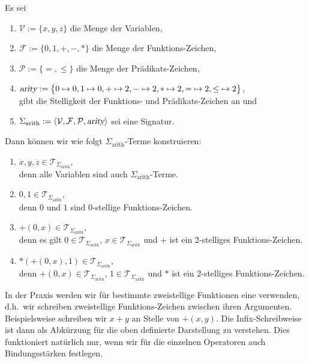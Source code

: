 \example
Es sei 
\begin{enumerate}
\item $\mathcal{V} := \{ x, y, z \}$ die Menge der Variablen,
\item $\mathcal{F} := \{ 0, 1, \mathtt{+}, \mathtt{-}, * \}$ die Menge der Funktions-Zeichen,
\item $\mathcal{P} := \{\mathtt{=}, \leq\}$ die Menge der Prädikats-Zeichen,
\item $\textsl{arity} := \bigl\{ 0 \mapsto 0, 1 \mapsto 0, \mathtt{+} \mapsto 2, \mathtt{-} \mapsto 2,
                                 * \mapsto 2, = \;\mapsto 2, \leq\; \mapsto 2 \bigr\}$, \\[0.2cm]
      gibt die Stelligkeit der Funktions- und Prädikats-Zeichen an und
\item $\Sigma_\mathrm{arith} := \langle \mathcal{V}, \mathcal{F}, \mathcal{P}, \textsl{arity} \rangle$
      sei eine Signatur.
\end{enumerate}
Dann können wir wie folgt $\Sigma_{\mathrm{arith}}$-Terme konstruieren:
\begin{enumerate}
\item $x, y, z \in \mathcal{T}_{\Sigma_{\mathrm{arith}}}$, \\[0.2cm]
      denn alle Variablen sind auch $\Sigma_{\mathrm{arith}}$-Terme.
\item $0, 1 \in \mathcal{T}_{\Sigma_{\mathrm{arith}}}$,  \\[0.2cm]
      denn $0$ und $1$ sind $0$-stellige Funktions-Zeichen.
\item $\mathtt{+}(0,x) \in \mathcal{T}_{\Sigma_{\mathrm{arith}}}$, \\[0.2cm]
      denn es gilt $0 \in \mathcal{T}_{\Sigma_{\mathrm{arith}}}$, $x \in \mathcal{T}_{\Sigma_{\mathrm{arith}}}$ und 
      $\mathtt{+}$ ist ein 2-stelliges Funktions-Zeichen.
\item $*(\mathtt{+}(0,x),1) \in \mathcal{T}_{\Sigma_{\mathrm{arith}}}$, \\[0.2cm]
      denn $\mathtt{+}(0,x) \in \mathcal{T}_{\Sigma_{\mathrm{arith}}}$, $1 \in \mathcal{T}_{\Sigma_{\mathrm{arith}}}$ und
      $*$ ist ein 2-stelliges Funktions-Zeichen.
\end{enumerate}
In der Praxis werden wir für bestimmte zweistellige Funktionen eine 
verwenden, d.h.~wir schreiben zweistellige Funktions-Zeichen zwischen ihren Argumenten.  Beispielsweise
schreiben wir $x+y$ an Stelle von $+(x,y)$. Die Infix-Schreibweise ist dann als Abkürzung für die oben
definierte Darstellung zu verstehen.  Dies funktioniert natürlich nur, wenn wir für die einzelnen Operatoren
auch Bindungsstärken festlegen. 
\eox


